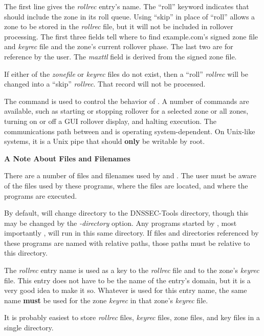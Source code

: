 The first line gives the {\it rollrec} entry's name.  The ``roll'' keyword
indicates that  should include the zone in its roll queue.  Using
``skip'' in place of ``roll'' allows a zone to be stored in the {\it rollrec}
file, but it will not be included in rollover processing.  The first three
fields tell  where to find example.com's signed zone file and
{\it keyrec} file and the zone's current rollover phase.  The last two are
for reference by the user.  The {\it maxttl} field is derived from the signed
zone file.

If either of the {\it zonefile} or {\it keyrec} files do not exist, then a
``roll'' {\it rollrec} will be changed into a ``skip'' {\it rollrec}.  That
record will not be processed.

The  command is used to control the behavior of .
A number of commands are available, such as starting or stopping rollover for
a selected zone or all zones, turning on or off a GUI rollover display, and
halting  execution.  The communications path between
 and  is operating system-dependent.  On Unix-like
systems, it is a Unix pipe that should {\bf only} be writable by root.

\clearpage
{\bf A Note About Files and Filenames}

There are a number of files and filenames used by  and
.  The user must be aware of the files used by these programs,
where the files are located, and where the programs are executed.

By default,  will change directory to the DNSSEC-Tools directory,
though this may be changed by the {\it -directory} option.  Any programs
started by , most importantly , will run in this
same directory.  If files and directories referenced by these programs are
named with relative paths, those paths must be relative to this directory.

The {\it rollrec} entry name is used as a key to the {\it rollrec} file and to
the zone's {\it keyrec} file.  This entry does not have to be the name of the
entry's domain, but it is a very good idea to make it so.  Whatever is used
for this entry name, the same name {\bf must} be used for the zone
{\it keyrec} in that zone's {\it keyrec} file.

It is probably easiest to store {\it rollrec} files, {\it keyrec} files, zone
files, and key files in a single directory.

